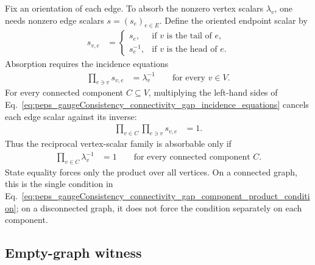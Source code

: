 \documentclass{article}
\begin{document}
Fix an orientation of each edge. To absorb the nonzero vertex scalars
$\lambda_v$, one needs nonzero edge scalars $s=(s_e)_{e\in E}$. Define the
oriented endpoint scalar by
\begin{align}
    s_{v,e}
        &=
        \begin{cases}
            s_e, & \text{if $v$ is the tail of $e$},\\
            s_e^{-1}, & \text{if $v$ is the head of $e$}.
        \end{cases}
    \label{eq:peps_gaugeConsistency_connectivity_gap_oriented_edge_scalar}
\end{align}
Absorption requires the incidence equations
\begin{align}
    \prod_{e\ni v}s_{v,e}
        &= \lambda_v^{-1}
        \qquad\text{for every }v\in V.
    \label{eq:peps_gaugeConsistency_connectivity_gap_incidence_equations}
\end{align}
For every connected component $C\subseteq V$, multiplying the left-hand sides
of Eq.~\ref{eq:peps_gaugeConsistency_connectivity_gap_incidence_equations}
cancels each edge scalar against its inverse:
\begin{align}
    \prod_{v\in C}\prod_{e\ni v}s_{v,e}
        &= 1.
    \label{eq:peps_gaugeConsistency_connectivity_gap_component_cancellation}
\end{align}
Thus the reciprocal vertex-scalar family is absorbable only if
\begin{align}
    \prod_{v\in C}\lambda_v^{-1}
        &= 1
        \qquad\text{for every connected component }C.
    \label{eq:peps_gaugeConsistency_connectivity_gap_component_product_condition}
\end{align}
State equality forces only the product over all vertices. On a connected graph,
this is the single condition in
Eq.~\ref{eq:peps_gaugeConsistency_connectivity_gap_component_product_condition};
on a disconnected graph, it does not force the condition separately on each
component.

\subsection{Empty-graph witness}
\end{document}
